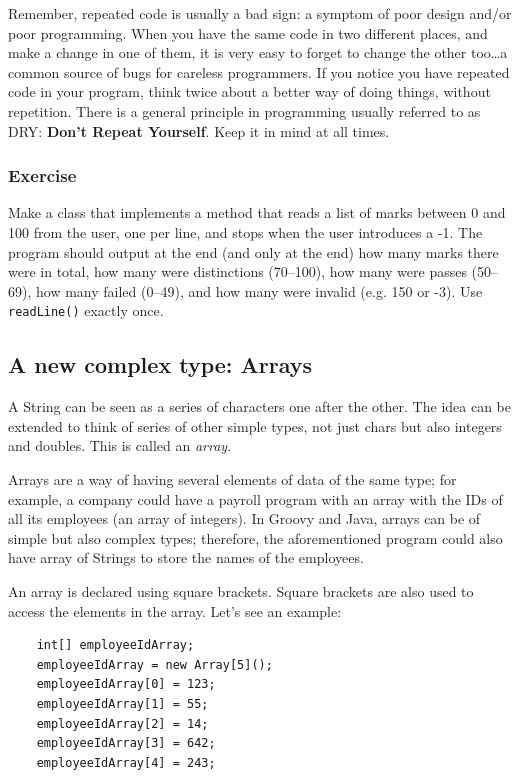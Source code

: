 Remember, repeated code is usually a bad sign: a symptom of poor
design and/or poor programming. When you have the same code in two
different places, and make a change in one of them, it is very easy to
forget to change the other too\ldots a common source of bugs for
careless programmers. If you notice you have repeated code in your
program, think twice about a better way of doing things, without
repetition. There is a general principle in programming usually
referred to as DRY: \textbf{Don't Repeat Yourself}. Keep it in mind at
all times.


\subsubsection*{Exercise}

Make a class that implements a method 
that reads a list of marks between 0 and 100 from the
user, one per line, and stops when the user introduces a -1. The
program should output at the end (and only at the end) how many marks
there were in total, how many were distinctions (70--100), how many
were passes (50--69), how many failed (0--49), and how many were
invalid (e.g. 150 or -3). Use \texttt{readLine()} exactly once.

\subsection{A new complex type: Arrays}
\label{sec:arrays}

A String can be seen as a series of characters one after the
other. The idea can be extended to think of series of other simple
types, not just chars but also integers and doubles. This is called an
\emph{array}. 

Arrays are a way of having several elements of data of the same type;
for example, a company could have a payroll program with an array with
the IDs of all its employees (an array of integers). In Groovy and
Java, arrays can be of simple but also complex types; therefore, the
aforementioned program could also have array of Strings to store the
names of the employees. 

An array is declared using square brackets. Square brackets are also
used to access the elements in the array. Let's see an example: 

\begin{verbatim}
    int[] employeeIdArray;
    employeeIdArray = new Array[5]();
    employeeIdArray[0] = 123;
    employeeIdArray[1] = 55;
    employeeIdArray[2] = 14;
    employeeIdArray[3] = 642;
    employeeIdArray[4] = 243;
\end{verbatim}

